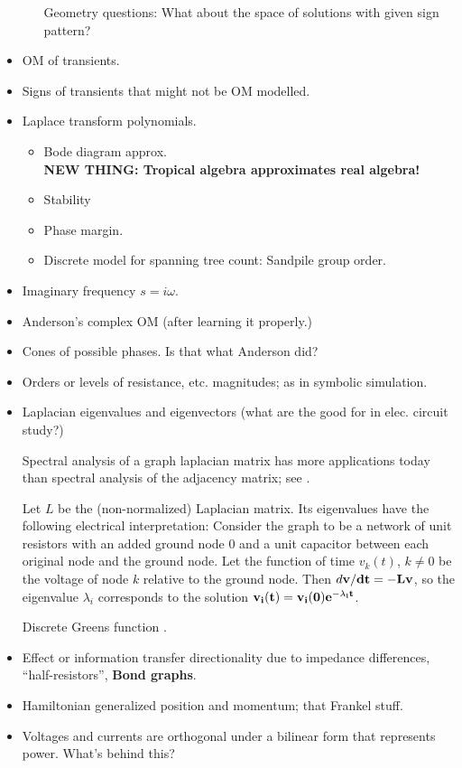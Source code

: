 \documentclass{article}
\begin{document}
\begin{itemize}
\begin{enumerate}
\begin{enumerate}
\end{enumerate}
Geometry questions:  What about the space of solutions with given sign pattern?
\end{enumerate}
\item OM of transients.
\item Signs of transients that might not be OM modelled.
\item Laplace transform polynomials.
\begin{itemize}
\item Bode diagram approx.\\
\textbf{NEW THING: Tropical algebra approximates real algebra!}
\item Stability
\item Phase margin.
\item Discrete model for spanning tree count: Sandpile group order.
\end{itemize}

\item Imaginary frequency $s=i\omega$.
\item Anderson's complex OM (after learning it properly.)
\item Cones of possible phases.  Is that what Anderson did?
\item Orders or levels of resistance, etc. magnitudes; as
in symbolic simulation.
\item Laplacian eigenvalues and eigenvectors  (what are the good for in elec. circuit
study?) 

Spectral analysis of a graph laplacian matrix has more applications today than
spectral analysis of the adjacency matrix; see \cite{ChungSpectralGraphTheory}.

Let $L$ be the (non-normalized) Laplacian matrix.  Its eigenvalues have the 
following electrical interpretation:  
Consider the graph to be a network of unit resistors with an added ground 
node $0$ and a unit capacitor between each original node and the ground node.  
Let the function of time $v_k(t)$, $k\neq 0$ be the voltage of node $k$ 
relative to 
the ground node.  Then $d\bf{v}/dt = -L\bf{v}$, so the eigenvalue $\lambda_i$
corresponds to the solution $\bf{v}_i(t) = \bf{v}_i(0)e^{-\lambda_i t}$.

Discrete Greens function \cite{ChungYaoDiscreteGreensFn}.

\item Effect or information transfer directionality due to impedance
differences, ``half-resistors'',  \textbf{Bond graphs}.
\item Hamiltonian generalized position and momentum; that Frankel stuff.
\item Voltages and currents are orthogonal under a bilinear form that 
represents power.  What's behind this?
\end{itemize}
\end{document}
